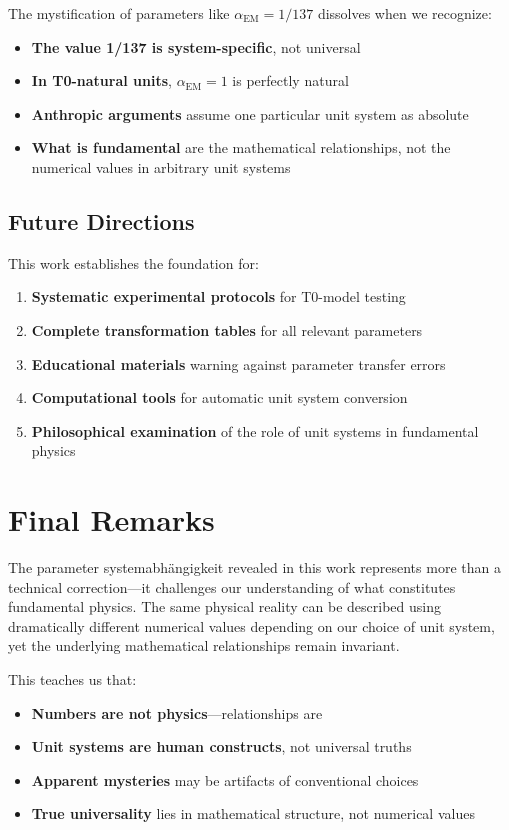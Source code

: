 \documentclass[12pt,a4paper]{article}
\newcommand{\alphaEM}{\alpha_{\text{EM}}}
\begin{document}
	The mystification of parameters like $\alphaEM = 1/137$ dissolves when we recognize:
	
	\begin{itemize}
		\item \textbf{The value 1/137 is system-specific}, not universal
		\item \textbf{In T0-natural units}, $\alphaEM = 1$ is perfectly natural
		\item \textbf{Anthropic arguments} assume one particular unit system as absolute
		\item \textbf{What is fundamental} are the mathematical relationships, not the numerical values in arbitrary unit systems
	\end{itemize}
	
	\subsection{Future Directions}
	\label{subsec:future_directions}
	
	This work establishes the foundation for:
	
	\begin{enumerate}
		\item \textbf{Systematic experimental protocols} for T0-model testing
		\item \textbf{Complete transformation tables} for all relevant parameters
		\item \textbf{Educational materials} warning against parameter transfer errors
		\item \textbf{Computational tools} for automatic unit system conversion
		\item \textbf{Philosophical examination} of the role of unit systems in fundamental physics
	\end{enumerate}
	
	\section{Final Remarks}
	\label{sec:final_remarks}
	
	The parameter systemabhängigkeit revealed in this work represents more than a technical correction---it challenges our understanding of what constitutes fundamental physics. The same physical reality can be described using dramatically different numerical values depending on our choice of unit system, yet the underlying mathematical relationships remain invariant.
	
	This teaches us that:
	\begin{itemize}
		\item \textbf{Numbers are not physics}---relationships are
		\item \textbf{Unit systems are human constructs}, not universal truths  
		\item \textbf{Apparent mysteries} may be artifacts of conventional choices
		\item \textbf{True universality} lies in mathematical structure, not numerical values
	\end{itemize}
	
\end{document}
